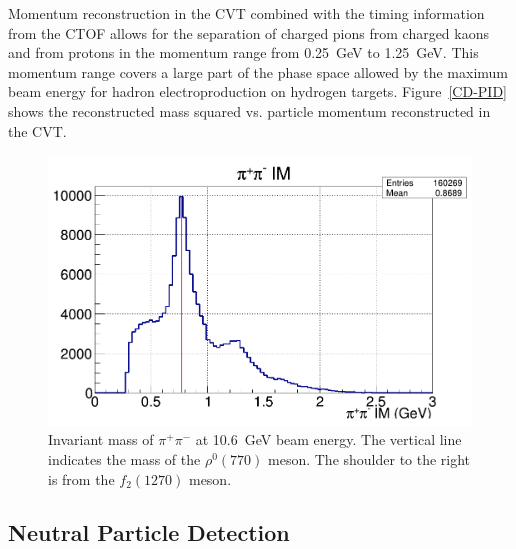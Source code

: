 \documentclass[final,3p,twocolumn]{elsarticle}
\begin{document}
Momentum reconstruction in the CVT combined with the timing information from the CTOF allows for the separation 
of charged pions from charged kaons and from protons in the momentum range from 0.25~GeV to 1.25~GeV. This
momentum range covers a large part of the phase space allowed by the maximum beam energy for hadron
electroproduction on hydrogen targets. Figure~\ref{CD-PID} shows the reconstructed mass squared vs. 
particle momentum reconstructed in the CVT.
\begin{figure}[t!]
\centerline{\includegraphics[width=1.0\columnwidth]{rhoMass.png}}
\caption{Invariant mass of $\pi^+\pi^-$ at 10.6~GeV beam energy. The vertical line indicates the mass of the
  $\rho^0(770)$ meson. The shoulder to the right is from the $f_2(1270)$ meson.}
\label{pip-pim-p}
\end{figure} 

\subsection{Neutral Particle Detection} 
\end{document}
